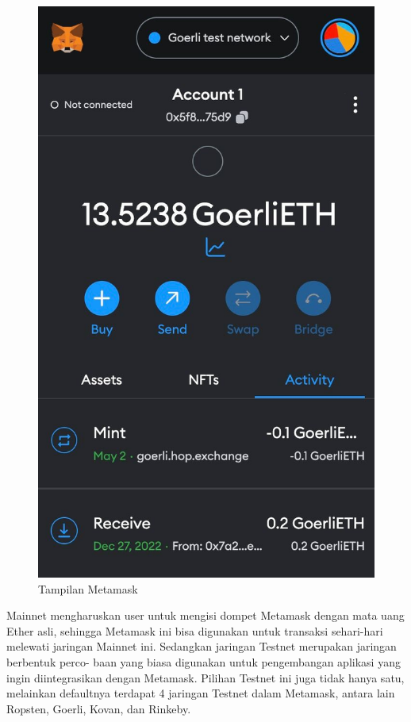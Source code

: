 \begin{figure}[H]
  \centering

  \includegraphics[scale=0.2]{gambar/tampilan-metamask.jpg}

  \caption{Tampilan Metamask}
  \label{fig:tampilanmetamask}
\end{figure}

Mainnet mengharuskan user untuk mengisi dompet Metamask dengan mata uang Ether asli, sehingga Metamask ini bisa digunakan untuk transaksi sehari-hari melewati jaringan Mainnet ini.
Sedangkan jaringan Testnet merupakan jaringan berbentuk perco- baan yang biasa digunakan untuk pengembangan aplikasi yang ingin diintegrasikan dengan Metamask. Pilihan Testnet ini juga tidak hanya satu, melainkan defaultnya terdapat
4 jaringan Testnet dalam Metamask, antara lain Ropsten, Goerli, Kovan, dan Rinkeby.

